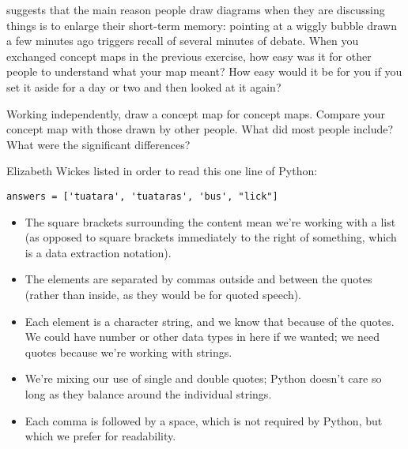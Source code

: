 
\cite{Cher2007} suggests that
the main reason people draw diagrams when they are discussing things
is to enlarge their short-term memory:
pointing at a wiggly bubble drawn a few minutes ago triggers recall of several minutes of debate.
When you exchanged concept maps in the previous exercise,
how easy was it for other people to understand what your map meant?
How easy would it be for you if you set it aside for a day or two and then looked at it again?


Working independently,
draw a concept map for concept maps.
Compare your concept map with those drawn by other people.
What did most people include?
What were the significant differences?


Elizabeth Wickes listed
in order to read this one line of Python:

\begin{verbatim}
answers = ['tuatara', 'tuataras', 'bus', "lick"]
\end{verbatim}

\begin{itemize}

\item
  The square brackets surrounding the content mean we're working with a list
  (as opposed to square brackets immediately to the right of something,
  which is a data extraction notation).

\item
  The elements are separated by commas outside and between the quotes
  (rather than inside, as they would be for quoted speech).

\item
  Each element is a character string,
  and we know that because of the quotes.
  We could have number or other data types in here if we wanted;
  we need quotes because we're working with strings.

\item
  We're mixing our use of single and double quotes;
  Python doesn't care so long as they balance around the individual strings.

\item
  Each comma is followed by a space,
  which is not required by Python,
  but which we prefer for readability.

\end{itemize}

